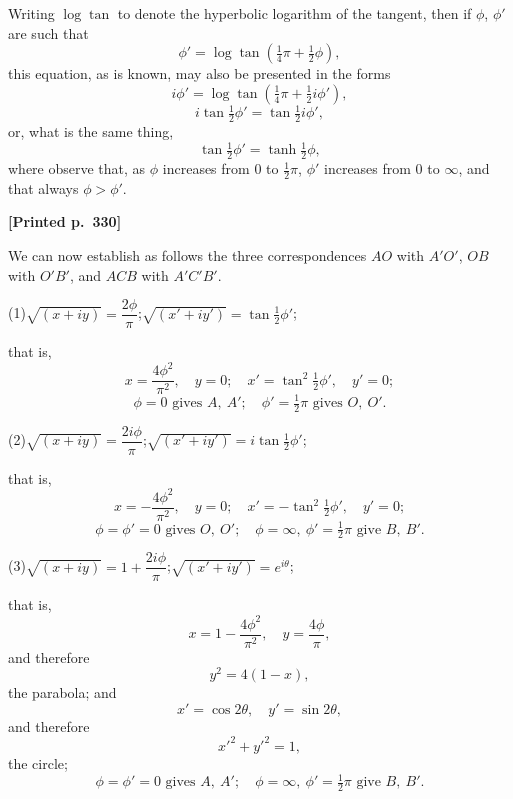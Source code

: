 \documentclass[11pt]{article}
\begin{document}
Writing $\log\tan$ to denote the hyperbolic logarithm of the tangent, then if $\phi$, $\phi'$ are such that
\[
\phi' = \log\tan(\tfrac{1}{4}\pi + \tfrac{1}{2}\phi),
\]
this equation, as is known, may also be presented in the forms
\[
i\phi' = \log\tan(\tfrac{1}{4}\pi + \tfrac{1}{2}i\phi'),
\]
\[
i\tan\tfrac{1}{2}\phi' = \tan\tfrac{1}{2}i\phi',
\]
or, what is the same thing,
\[
\tan\tfrac{1}{2}\phi' = \tanh\tfrac{1}{2}\phi,
\]
where observe that, as $\phi$ increases from $0$ to $\tfrac{1}{2}\pi$, $\phi'$ increases from $0$ to $\infty$, and that always $\phi > \phi'$.

\medskip

\noindent\textbf{[Printed p.~330]}\hfill

\medskip

We can now establish as follows the three correspondences $AO$ with $A'O'$, $OB$ with $O'B'$, and $ACB$ with $A'C'B'$.

\medskip

\noindent(1)\quad $\sqrt{(x + iy)} = \dfrac{2\phi}{\pi}$;\quad $\sqrt{(x' + iy')} = \tan\tfrac{1}{2}\phi'$;

\medskip

\noindent that is,
\[
x = \frac{4\phi^{2}}{\pi^{2}},\quad y = 0;\quad x' = \tan^{2}\tfrac{1}{2}\phi',\quad y' = 0;
\]
\[
\phi = 0 \text{ gives } A,\ A';\quad \phi' = \tfrac{1}{2}\pi \text{ gives } O,\ O'.
\]

\medskip

\noindent(2)\quad $\sqrt{(x + iy)} = \dfrac{2i\phi}{\pi}$;\quad $\sqrt{(x' + iy')} = i\tan\tfrac{1}{2}\phi'$;

\medskip

\noindent that is,
\[
x = -\frac{4\phi^{2}}{\pi^{2}},\quad y = 0;\quad x' = -\tan^{2}\tfrac{1}{2}\phi',\quad y' = 0;
\]
\[
\phi = \phi' = 0 \text{ gives } O,\ O';\quad \phi = \infty,\ \phi' = \tfrac{1}{2}\pi \text{ give } B,\ B'.
\]

\medskip

\noindent(3)\quad $\sqrt{(x + iy)} = 1 + \dfrac{2i\phi}{\pi}$;\quad $\sqrt{(x' + iy')} = e^{i\theta}$;

\medskip

\noindent that is,
\[
x = 1 - \frac{4\phi^{2}}{\pi^{2}},\quad y = \frac{4\phi}{\pi},
\]
\noindent and therefore
\[
y^{2} = 4(1 - x),
\]
\noindent the parabola; and
\[
x' = \cos 2\theta,\quad y' = \sin 2\theta,
\]
\noindent and therefore
\[
x'^{2} + y'^{2} = 1,
\]
\noindent the circle;
\[
\phi = \phi' = 0 \text{ gives } A,\ A';\quad \phi = \infty,\ \phi' = \tfrac{1}{2}\pi \text{ give } B,\ B'.
\]
\end{document}
